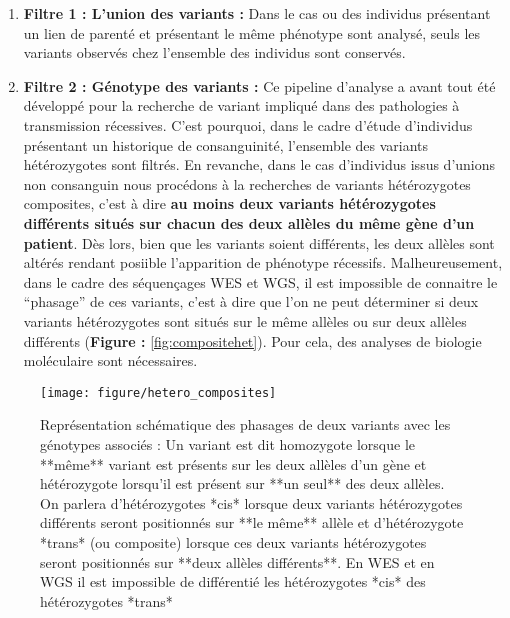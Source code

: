 \documentclass[12pt,twoside]{reedthesis}
\theoremstyle{definition}
\theoremstyle{definition}
\theoremstyle{remark}
\begin{document}
  \begin{enumerate}
  \def\labelenumi{\arabic{enumi}.}
  \item
    \textbf{Filtre 1 : L'union des variants :} Dans le cas ou des
    individus présentant un lien de parenté et présentant le même
    phénotype sont analysé, seuls les variants observés chez l'ensemble
    des individus sont conservés.
  \item
    \textbf{Filtre 2 : Génotype des variants :} Ce pipeline d'analyse a
    avant tout été développé pour la recherche de variant impliqué dans
    des pathologies à transmission récessives. C'est pourquoi, dans le
    cadre d'étude d'individus présentant un historique de consanguinité,
    l'ensemble des variants hétérozygotes sont filtrés. En revanche, dans
    le cas d'individus issus d'unions non consanguin nous procédons à la
    recherches de variants hétérozygotes composites, c'est à dire
    \textbf{au moins deux variants hétérozygotes différents situés sur
    chacun des deux allèles du même gène d'un patient}. Dès lors, bien que
    les variants soient différents, les deux allèles sont altérés rendant
    posiible l'apparition de phénotype récessifs. Malheureusement, dans le
    cadre des séquençages WES et WGS, il est impossible de connaitre le
    ``phasage'' de ces variants, c'est à dire que l'on ne peut déterminer
    si deux variants hétérozygotes sont situés sur le même allèles ou sur
    deux allèles différents (\textbf{Figure : }\ref{fig:compositehet}).
    Pour cela, des analyses de biologie moléculaire sont nécessaires.
  \end{enumerate}
  
  \newpage
  
  \begin{figure}
  
  {\centering \texttt{[image: figure/hetero\_composites]} 
  
  }
  
  \caption[Représentation schématique des phasages de deux variants avec les génotypes associés]{Représentation schématique des phasages de deux variants avec les génotypes associés : Un variant est dit homozygote lorsque le **même** variant est présents sur les deux allèles d'un gène et hétérozygote lorsqu'il est présent sur **un seul** des deux allèles. On parlera d'hétérozygotes *cis* lorsque deux variants hétérozygotes différents seront positionnés sur **le même** allèle et d'hétérozygote *trans* (ou composite) lorsque ces deux variants hétérozygotes seront positionnés sur **deux allèles différents**. En WES et en WGS il est impossible de différentié les hétérozygotes *cis* des hétérozygotes *trans*}\label{fig:piccompositehet}
  \end{figure}
  
\end{document}
